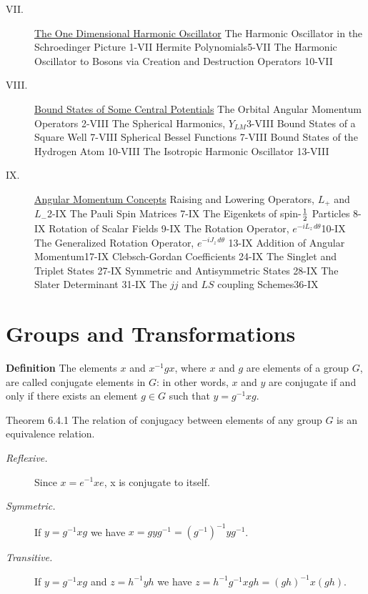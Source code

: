 \documentclass[epsf]{article}
\begin{document}
\begin{description}
\item[VII.] \underline{The One Dimensional Harmonic Oscillator}
\subitem The Harmonic Oscillator in the Schroedinger Picture \hfill 1-VII
\subitem Hermite Polynomials\hfill 5-VII
\subitem The Harmonic Oscillator to Bosons via Creation and Destruction Operators \hfill 10-VII
 
\item[VIII.] \underline{Bound States of Some Central Potentials}
\subitem The Orbital Angular Momentum Operators \hfill 2-VIII
\subitem The Spherical Harmonics, $Y_{LM}$\hfill 3-VIII
\subitem Bound States of a Square Well \hfill 7-VIII
\subitem Spherical Bessel Functions \hfill 7-VIII
\subitem Bound States of the Hydrogen Atom \hfill 10-VIII
\subitem The Isotropic Harmonic Oscillator \hfill 13-VIII

\item[IX.]\underline{Angular Momentum Concepts}
\subitem Raising and Lowering Operators, $L_+$ and $L_-$\hfill 2-IX
\subitem The Pauli Spin Matrices \hfill 7-IX
\subitem The Eigenkets of spin-$1\over2$ Particles \hfill 8-IX
\subitem Rotation of Scalar Fields \hfill 9-IX
\subitem The Rotation Operator, $e^{-iL_z \,d\theta}$\hfill 10-IX
\subitem The Generalized Rotation Operator, $e^{-iJ_z \,d\theta}$ \hfill 13-IX
\subitem Addition of Angular Momentum\hfill 17-IX
\subitem Clebsch-Gordan Coefficients \hfill 24-IX
\subitem The Singlet and Triplet States \hfill 27-IX
\subitem Symmetric and Antisymmetric States \hfill 28-IX
\subitem The Slater Determinant \hfill 31-IX
\subitem The $jj$ and $LS$ coupling Schemes\hfill 36-IX

\end{description}
\setcounter{section}{-1}






\section{Groups and Transformations}

{\bf Definition} The elements $x$ and $x^{-1}gx$, where $x$ and $g$ are
elements of a group $G$, are called conjugate elements in $G$: in other 
words, $x$ and $y$ are conjugate if and only if there exists an element 
$g\in G$ such that $y = g^{-1}xg$.

Theorem 6.4.1 The relation of conjugacy between elements of any group
$G$ is an equivalence relation. 
\begin{description}
\item[\it Reflexive.] Since $x = e^{-1}xe$, x is conjugate to itself.
\item[\it Symmetric.] If $y=g^{-1}xg$ we have $x=gyg^{-1} =
(g^{-1})^{-1}y g^{-1}$.
\item[\it Transitive.] If $y=g^{-1}xg$ and $z=h^{-1}yh$ we have
$z=h^{-1}g^{-1}xgh=(gh)^{-1}x(gh).$
\end{description}
\end{document}
